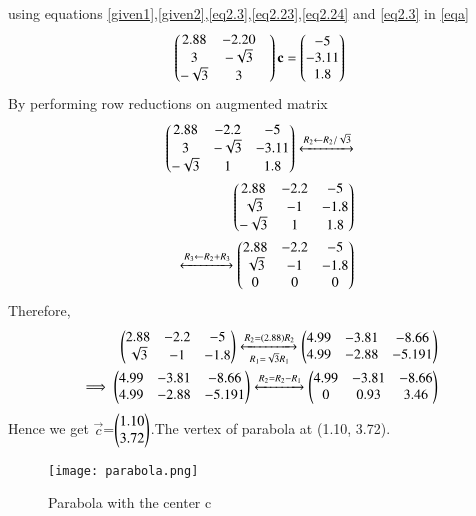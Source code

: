 \documentclass[journal,12pt,twocolumn]{IEEEtran}
\begin{document}
using equations \eqref{given1},\eqref{given2},\eqref{eq2.3},\eqref{eq2.23},\eqref{eq2.24} and \eqref{eq2.3} in \eqref{eqa}
\begin{align}
    \begin{pmatrix}2.88 & -2.20 & \\3 & -\sqrt{3}\\ -\sqrt{3}& 3\end{pmatrix}\mathbf{c} =\begin{pmatrix} -5\\-3.11 \\1.8\end{pmatrix}\label{eqcen}
\end{align}
By performing row reductions on augmented matrix
\begin{align}
\begin{pmatrix}2.88 & -2.2 & -5\\3 & -\sqrt{3} & -3.11\\-\sqrt{3} & 1 & 1.8\end{pmatrix}\xleftrightarrow[]{R_2\leftarrow R_2/\sqrt{3}}\\
\begin{pmatrix}2.88 & -2.2 & -5\\\sqrt{3} & -1 & -1.8\\-\sqrt{3} & 1 & 1.8 \end{pmatrix}\\
\xleftrightarrow[]{R_3\leftarrow R_2+R_3}
\begin{pmatrix}2.88 & -2.2 & -5\\\sqrt{3} & -1 & -1.8\\0 & 0 & 0\end{pmatrix}
\end{align}
Therefore, 
\begin{align}
\begin{pmatrix}2.88 & -2.2 & -5\\\sqrt{3} & -1 & -1.8\end{pmatrix}\xleftrightarrow[R_1={\sqrt{3}}R_1]{R_2=(2.88)R_2}
\begin{pmatrix}4.99 & -3.81 & -8.66\\4.99 & -2.88 & -5.191\end{pmatrix}\\
\implies \begin{pmatrix}4.99 & -3.81 & -8.66\\4.99 & -2.88 & -5.191\end{pmatrix}\xleftrightarrow{R_2=R_2-R_1}
\begin{pmatrix}4.99 & -3.81 & -8.66\\0 & 0.93& 3.46\end{pmatrix}
\end{align}
Hence we get $\vec{c}$=$\begin{pmatrix}1.10\\3.72\end{pmatrix}$.The vertex of parabola at (1.10, 3.72).
\renewcommand{\thefigure}{1}
\begin{figure}[!ht]
    \centering
    \texttt{[image: parabola.png]}
    \caption{Parabola with the center c}
    \label{Fig:1}
\end{figure}
\end{document}
